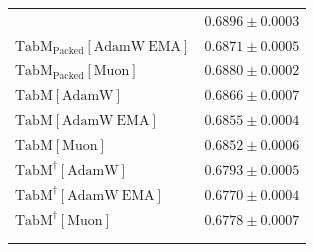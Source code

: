 \begin{longtable}{p{}p{}}
{\begin{tabular}{ll}
{\footnotesize $\mathrm{TabM_{\text{Packed}}[AdamW]}$ } & {\footnotesize$0.6896 \pm 0.0003$}\\ 
{\footnotesize $\mathrm{TabM_{\text{Packed}}[AdamW\ EMA]}$ } & {\footnotesize$0.6871 \pm 0.0005$}\\ 
{\footnotesize $\mathrm{TabM_{\text{Packed}}[Muon]}$ } & {\footnotesize$0.6880 \pm 0.0002$}\\ 
{\footnotesize $\mathrm{TabM[AdamW]}$ } & {\footnotesize$0.6866 \pm 0.0007$}\\ 
{\footnotesize $\mathrm{TabM[AdamW\ EMA]}$ } & {\footnotesize$0.6855 \pm 0.0004$}\\ 
{\footnotesize $\mathrm{TabM[Muon]}$ } & {\footnotesize$0.6852 \pm 0.0006$}\\ 
{\footnotesize $\mathrm{TabM^\dagger[AdamW]}$ } & {\footnotesize$0.6793 \pm 0.0005$}\\ 
{\footnotesize $\mathrm{TabM^\dagger[AdamW\ EMA]}$ } & {\footnotesize$0.6770 \pm 0.0004$}\\ 
{\footnotesize $\mathrm{TabM^\dagger[Muon]}$ } & {\footnotesize$0.6778 \pm 0.0007$}\\ 
\bottomrule
\end{tabular}}

\\
\topalign{
\centering
\setlength\tabcolsep{2.5pt}
\renewcommand{\arraystretch}{0.8}
\begin{tabular}{ll}


\end{tabular}}
\end{longtable}
